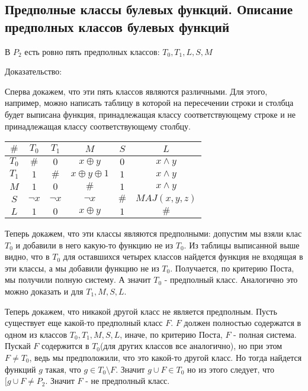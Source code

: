 \subsection{Предполные классы булевых функций. Описание предполных классов булевых функций}

В $P_2$ есть ровно пять предполных классов: $T_0, T_1, L, S, M$

Доказательство:

Сперва докажем, что эти пять классов являются различными. Для этого, например, можно написать таблицу в которой на пересечении строки и столбца будет выписана функция, принадлежащая классу соответствующему строке и не принадлежащая классу соответствующему столбцу.

\begin{tabular}{ |c|c|c|c|c|c| } 
	\hline
	$\#$ & $T_0$ & $T_1$ & $M$ & $S$ & $L$ \\ 
	\hline
	$T_0$ & $\#$ & $0$ & $x \oplus y$ & $0$ & $x \wedge y$\\ 
	\hline
	$T_1$ & $1$ & $\#$ & $x \oplus y \oplus 1$ & $1$ & $x \wedge y$\\ 
	\hline
	$M$ & $1$ & $0$ & $\#$ & $1$ & $x \wedge y$\\ 
	\hline
	$S$ & $\lnot x$ & $\lnot x$ & $\lnot x$ & $\#$ & $MAJ(x, y, z)$\\ 
	\hline
	$L$ & $1$ & $0$ & $x \oplus y$ & $1$ & $\#$\\ 
	\hline
\end{tabular}

Теперь докажем, что эти классы являются предполными: допустим мы взяли клас $T_0$ и добавили в него какую-то функцию не из $T_0$. Из таблицы выписанной выше видно, что в $T_0$ для оставшихся четырех классов найдется функция не входящая в эти классы, а мы добавили функцию не из $T_0$. Получается, по критерию Поста, мы получили полную систему. А значит $T_0$ - предполный класс. Аналогично это можно доказать и для $T_1, M, S, L$.

Теперь докажем, что никакой другой класс не является предполным. Пусть существует еще какой-то предполный класс $F$. $F$ должен полностью содержатся в одном из классов $T_0, T_1, M, S, L$, иначе, по критерию Поста, $F$ - полная система. Пускай $F$ содержится в $T_0$(для других классов все аналогично), но при этом $F \neq T_0$, ведь мы предположили, что это какой-то другой класс. Но тогда найдется функций $g$ такая, что $g \in T_0 \setminus F$. Значит $g \cup F \in T_0$ но из этого следует, что $[g \cup F \neq P_2$. Значит $F$ - не предполный класс. 